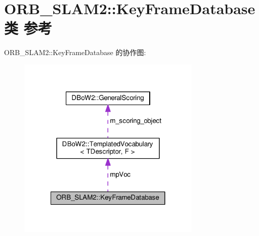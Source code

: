 \hypertarget{classORB__SLAM2_1_1KeyFrameDatabase}{\section{O\-R\-B\-\_\-\-S\-L\-A\-M2\-:\-:Key\-Frame\-Database类 参考}
\label{classORB__SLAM2_1_1KeyFrameDatabase}
}


O\-R\-B\-\_\-\-S\-L\-A\-M2\-:\-:Key\-Frame\-Database 的协作图\-:
\nopagebreak
\begin{figure}[H]
\begin{center}
\leavevmode
\includegraphics[width=248pt]{classORB__SLAM2_1_1KeyFrameDatabase__coll__graph}
\end{center}
\end{figure}
